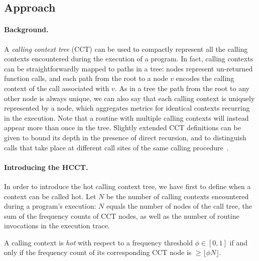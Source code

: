 \subsection{Approach}
\label{ss:hcct-approach}

\paragraph*{Background.} A {\em calling context tree} (CCT) can be used to compactly represent all the calling contexts encountered during the execution of a program. In fact, calling contexts can be straightforwardly mapped to paths in a tree: nodes represent un-returned function calls, and each path from the root to a node $v$ encodes the calling context of the call associated with $v$. As in a tree the path from the root to any other node is always unique, we can also say that each calling context is uniquely represented by a node, which aggregates metrics for identical contexts recurring in the execution. Note that a routine with multiple calling contexts will instead appear more than once in the tree. Slightly extended CCT definitions can be given to bound its depth in the presence of direct recursion, and to distinguish calls that take place at different call sites of the same calling procedure~\cite{Ammons97}.


\paragraph*{Introducing the HCCT.} In order to introduce the hot calling context tree, we have first to define when a context can be called hot. Let $N$ be the number of calling contexts encountered during a program's execution: $N$ equals the number of nodes of the call tree, the sum of the frequency counts of CCT nodes, as well as the number of routine invocations in the execution trace. 

\begin{definition}
A calling context is {\em hot} with respect to a frequency threshold $\phi\in[0,1]$ if and only if the frequency count of its corresponding CCT node is $\geq \lfloor\phi N\rfloor$. 
\end{definition}

